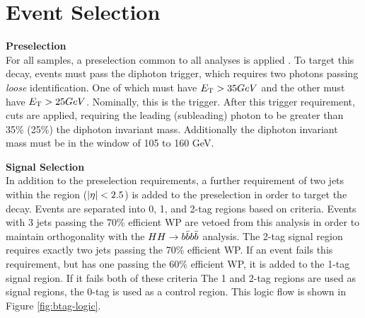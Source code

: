 \section{Event Selection}
\noindent\textbf{Preselection}\\
\indent For all samples, a preselection common to all \Hgg analyses is applied \cite{hgam-preselection}. To target this decay, events must pass the diphoton trigger, which requires two photons passing \textit{loose} identification. One of which must have $\et > \unit{35}{GeV}$ and the other must have $\et > \unit{25}{GeV}$. Nominally, this is the  trigger. After this trigger requirement, \pt cuts are applied, requiring the leading (subleading) photon \pt to be greater than 35\% (25\%) the diphoton invariant mass. Additionally the diphoton invariant mass must be in the window of 105 to 160 GeV.

\noindent\textbf{Signal Selection}\\
\indent In addition to the preselection requirements, a further requirement of two jets within the \btagging region ($|\eta| <2.5$) is added to the preselection in order to target the \Hbb decay. Events are separated into 0, 1, and 2-tag regions based on \btagging criteria. Events with 3 jets passing the 70\% efficient \btagging \gls{WP} are vetoed from this analysis in order to maintain orthogonality with the $HH \rightarrow b\bar{b} b\bar{b}$ analysis. The 2-tag signal region requires exactly two jets passing the 70\% efficient \btagging \gls{WP}. If an event fails this requirement, but has one \bjet passing the 60\% efficient \btagging \gls{WP}, it is added to the 1-tag signal region. If it fails both of these criteria The 1 and 2-tag regions are used as signal regions, the 0-tag is used as a control region. This logic flow is shown in Figure \ref{fig:btag-logic}.


